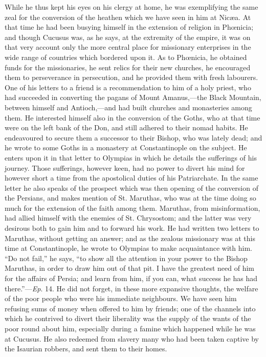 While he thus kept his eyes on his clergy at home, he was
exemplifying the same zeal for the conversion of the heathen which we
have seen in him at Nicæa. At that time he had been busying himself
in the extension of religion in Phœnicia; and though Cucusus was, as
he says, at the extremity of the empire, it was on that very account
only the more central place for missionary enterprises in the wide
range of countries which bordered upon it. As to Phœnicia, he
obtained funds for the missionaries, he sent relics for their new
churches, he encouraged them to perseverance in persecution, and he
provided them with fresh labourers. One of his letters to a friend is
a recommendation to him of a holy priest, who had succeeded in
converting the pagans of Mount Amanus,—the Black Mountain, between
himself and Antioch,—and had built churches and monasteries among
them. He interested himself also in the conversion of the Goths, who
at that time were on the left bank of the Don, and still adhered to
their nomad habits. He endeavoured to secure them a successor to their
Bishop, who was lately dead; and he wrote to some Goths in a monastery
at Constantinople on the subject. He enters upon it in that letter to
Olympias in which he details the sufferings of his journey. Those
sufferings, however keen, had no power to divert his mind for however
short a time from the apostolical duties of his Patriarchate. In the
same letter he also speaks of the prospect which was then opening of
the conversion of the Persians, and makes mention of St. Maruthas, who
was at the time doing so much for the extension of the faith among
them. Maruthas, from misinformation, had allied himself with the
enemies of St. Chrysostom; and the latter was very desirous both to
gain him and to forward his work. He had written two letters to
Maruthas, without getting an answer; and as the zealous missionary was
at this time at Constantinople, he wrote to Olympias to make
acquaintance with him. ``Do not fail,'' he says, ``to show
all the attention in your power to the Bishop Maruthas, in order to
draw him out of that pit. I have the greatest need of him for the
affairs of Persia; and learn from him, if you can, what success he has
had there.''—\emph{Ep}. 14. He did not forget, in these
more expansive thoughts, the welfare of the poor people who were his
immediate neighbours. We have seen him refusing sums of money when
offered to him by friends; one of the channels into which he contrived
to divert their liberality was the supply of the wants of the poor
round about him, especially during a famine which happened while he
was at Cucusus. He also redeemed from slavery many who had been taken
captive by the Isaurian robbers, and sent them to their homes.

